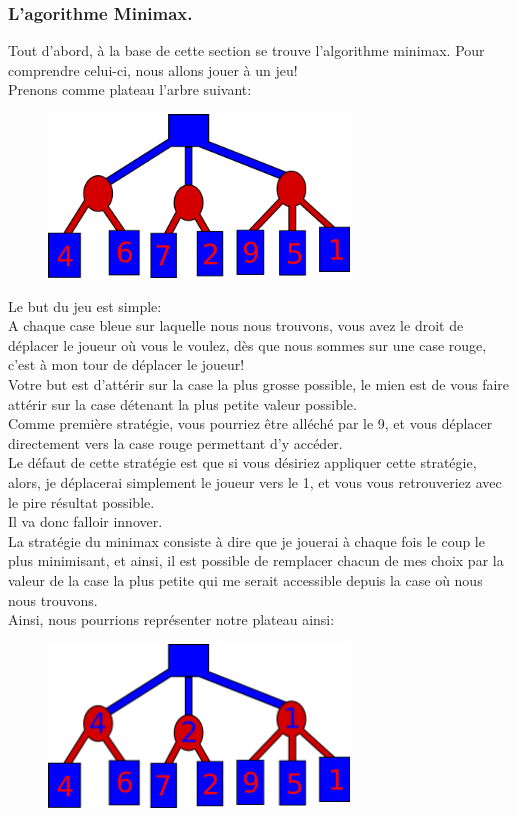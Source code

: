 \documentclass[a4paper, 12pt]{article}
\numberwithin{equation}{subsection}
\begin{document}
\subsubsection{L'agorithme Minimax.}
Tout d'abord, à la base de cette section se trouve l'algorithme minimax. Pour comprendre celui-ci, nous allons jouer à un jeu!\\
Prenons comme plateau l'arbre suivant:
\begin{figure}[H]
  \centering
  \includegraphics[width=8.0cm]{imgs/minimax_start.png}
\end{figure}
Le but du jeu est simple: \\
A chaque case bleue sur laquelle nous nous trouvons, vous avez le droit de déplacer le joueur où vous le voulez, dès que nous sommes sur une case rouge, c'est à mon tour de déplacer le joueur!\\
Votre but est d'attérir sur la case la plus grosse possible, le mien est de vous faire attérir sur la case détenant la plus petite valeur possible.\\
Comme première stratégie, vous pourriez être alléché par le 9, et vous déplacer directement vers la case rouge permettant d'y accéder. \\Le défaut de cette stratégie est que si vous désiriez appliquer cette stratégie, alors, je déplacerai simplement le joueur vers le 1, et vous vous retrouveriez avec le pire résultat possible.\\
Il va donc falloir innover.\\
La stratégie du minimax consiste à dire que je jouerai à chaque fois le coup le plus minimisant, et ainsi, il est possible de remplacer chacun de mes choix par la valeur de la case la plus petite qui me serait accessible depuis la case où nous nous trouvons.\\
Ainsi, nous pourrions représenter notre plateau ainsi:\\
\begin{figure}[H]
  \centering
  \includegraphics[width=8.0cm]{imgs/minimax.png}
\end{figure}
\end{document}
